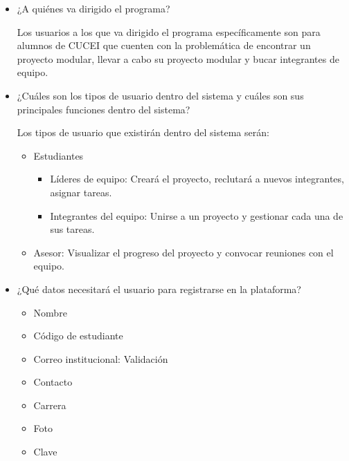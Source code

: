 	\begin{itemize}
		\item ¿A quiénes va dirigido el programa?

			Los usuarios a los que va dirigido el programa específicamente son para alumnos
			de CUCEI que cuenten con la problemática de encontrar un proyecto modular,
			llevar a cabo su proyecto modular y bucar integrantes de equipo.

		\item ¿Cuáles son los tipos de usuario dentro del sistema y cuáles son sus principales
			funciones dentro del sistema?

			Los tipos de usuario que existirán dentro del sistema serán:

			\begin{itemize}
				\item Estudiantes

					\begin{itemize}
						\item Líderes de equipo: Creará el proyecto, reclutará a nuevos integrantes,
							asignar tareas.

						\item Integrantes del equipo: Unirse a un proyecto y gestionar cada
							una de sus tareas.
					\end{itemize}

				\item Asesor: Visualizar el progreso del proyecto y convocar reuniones con
					el equipo.
			\end{itemize}

		\item ¿Qué datos necesitará el usuario para registrarse en la plataforma?

			\begin{itemize}
				\item Nombre

				\item Código de estudiante

				\item Correo institucional: Validación

				\item Contacto

				\item Carrera

				\item Foto

				\item Clave
			\end{itemize}


\end{itemize}
